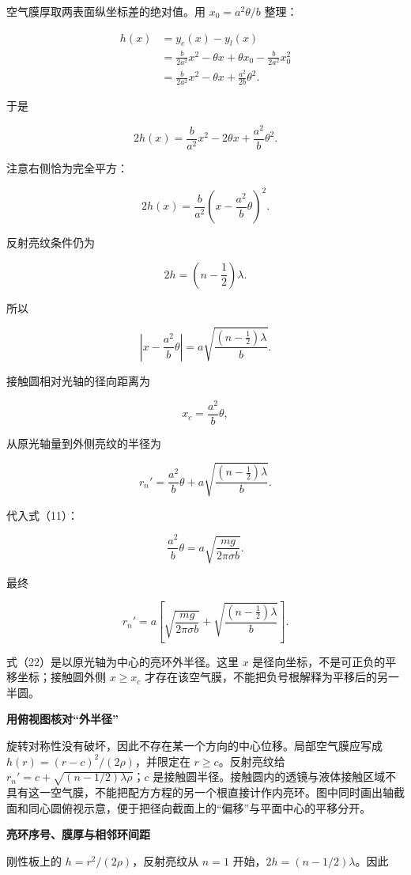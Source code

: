 \documentclass[12pt,a4paper,UTF8]{ctexart}
\begin{document}
空气膜厚取两表面纵坐标差的绝对值。用 \(x_0=a^2\theta/b\) 整理：

\[
\begin{aligned}
h(x)
&=y_e(x)-y_l(x)\\
&=\frac{b}{2a^2}x^2-\theta x
+\theta x_0-\frac{b}{2a^2}x_0^2\\
&=\frac{b}{2a^2}x^2-\theta x
+\frac{a^2}{2b}\theta^2.
\end{aligned}
\tag{17}
\]

于是

\[
2h(x)
=\frac{b}{a^2}x^2-2\theta x+\frac{a^2}{b}\theta^2.
\tag{18}
\]

注意右侧恰为完全平方：

\[
2h(x)
=\frac{b}{a^2}
\left(x-\frac{a^2}{b}\theta\right)^2.
\tag{19}
\]

反射亮纹条件仍为

\[
2h=\left(n-\frac12\right)\lambda.
\]

所以

\[
\left|
x-\frac{a^2}{b}\theta
\right|
=a\sqrt{\frac{(n-\frac12)\lambda}{b}}.
\tag{20}
\]

接触圆相对光轴的径向距离为

\[
x_c=\frac{a^2}{b}\theta,
\]

从原光轴量到外侧亮纹的半径为

\[
r_n'
=\frac{a^2}{b}\theta
+a\sqrt{\frac{(n-\frac12)\lambda}{b}}.
\tag{21}
\]

代入式（11）：

\[
\frac{a^2}{b}\theta
=a\sqrt{\frac{mg}{2\pi\sigma b}}.
\]

最终

\[
\boxed{
r_n'
=a\left[
\sqrt{\frac{mg}{2\pi\sigma b}}
+\sqrt{\frac{(n-\frac12)\lambda}{b}}
\right]
}.
\tag{22}
\]

式（22）是以原光轴为中心的亮环外半径。这里 \(x\)
是径向坐标，不是可正负的平移坐标；接触圆外侧 \(x\ge x_c\)
才存在该空气膜，不能把负号根解释为平移后的另一半圆。

\textbf{用俯视图核对``外半径''}

旋转对称性没有破坏，因此不存在某一个方向的中心位移。局部空气膜应写成
\(h(r)=(r-c)^2/(2\rho)\)，并限定在 \(r\ge c\)。反射亮纹给
\(r_n'=c+\sqrt{(n-1/2)\lambda\rho}\)；\(c\)
是接触圆半径。接触圆内的透镜与液体接触区域不具有这一空气膜，不能把配方方程的另一个根直接计作内亮环。图中同时画出轴截面和同心圆俯视示意，便于把径向截面上的``偏移''与平面中心的平移分开。

\textbf{亮环序号、膜厚与相邻环间距}

刚性板上的 \(h=r^2/(2\rho)\)，反射亮纹从 \(n=1\)
开始，\(2h=(n-1/2)\lambda\)。因此
\end{document}
